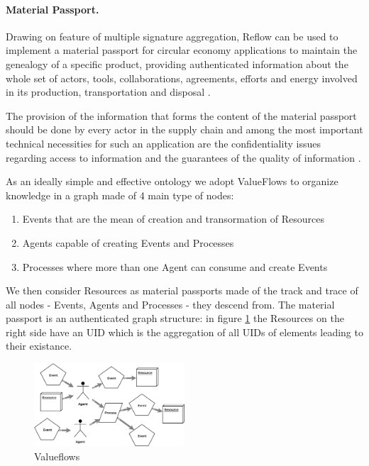 \documentclass[twocolumn]{article}
\begin{document}
\paragraph*{Material Passport.}
Drawing on feature of multiple signature aggregation, Reflow can
be used to implement a {material passport} for circular economy
applications \citep{material-passport} to maintain the genealogy of a
specific product, providing authenticated information about  the whole
set of actors, tools, collaborations, agreements, efforts and energy
involved in its production, transportation and disposal
\citep{Reflow-os}.

The provision of the information that forms the content of the material
passport should be done by every actor in the supply chain and among the
most important technical necessities for such an application are the
confidentiality issues regarding access to information and the
guarantees of the quality of information \citep{resources-passport}.

As an ideally simple and effective ontology we adopt ValueFlows to organize
knowledge in a graph made of 4 main type of nodes:

\begin{enumerate}
  \item Events that are the mean of creation and transormation of Resources
  \item Agents capable of creating Events and Processes
  \item Processes where more than one Agent can consume and create Events
\end{enumerate}

We then consider Resources as material passports made of the track and
trace of all nodes - Events, Agents and Processes - they descend from.
The  material passport is an authenticated graph structure: in figure
\ref{fig:valueflows} the Resources on the right side have an UID which
is the aggregation of all UIDs of elements leading to their existance.

\begin{figure}
  \caption{Valueflows}
  \label{fig:valueflows}
  \centering
  \includegraphics[width=0.5\textwidth]{valueflows.eps}
\end{figure}
\end{document}

